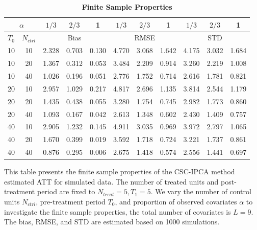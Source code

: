 \documentclass[12pt]{article}
\begin{document}
\begin{table}[!ht]
    \centering
    \caption{\textbf{Finite Sample Properties}}
    \label{tab: finite sample}
    \begin{tabular}{cc|ccc|ccc|ccc}
    \toprule
    \multicolumn{2}{c|}{$\alpha$} & $1/3$ & $2/3$ & 1 & $1/3$ & $2/3$ & 1 & $1/3$ & $2/3$ & 1 \\
    \hline
    $T_0$ & $N_{ctrl}$ & \multicolumn{3}{c|}{Bias} & \multicolumn{3}{c|}{RMSE}  & \multicolumn{3}{c}{STD} \\
    \hline
    10 & 10 & 2.328 & 0.703 & 0.130 & 4.770 & 3.068 & 1.642 & 4.175 & 3.032 & 1.684 \\
    10 & 20 & 1.367 & 0.312 & 0.053 & 3.484 & 2.209 & 0.914 & 3.260 & 2.219 & 1.008 \\
    10 & 40 & 1.026 & 0.196 & 0.051 & 2.776 & 1.752 & 0.714 & 2.616 & 1.781 & 0.821 \\
    \cline{1-11}
    20 & 10 & 2.957 & 1.029 & 0.217 & 4.817 & 2.696 & 1.135 & 3.814 & 2.544 & 1.179 \\
    20 & 20 & 1.435 & 0.438 & 0.055 & 3.280 & 1.754 & 0.745 & 2.982 & 1.773 & 0.860 \\
    20 & 40 & 1.093 & 0.167 & 0.042 & 2.613 & 1.348 & 0.602 & 2.430 & 1.409 & 0.757 \\
    \cline{1-11}
    40 & 10 & 2.905 & 1.232 & 0.145 & 4.911 & 3.035 & 0.969 & 3.972 & 2.797 & 1.065 \\
    40 & 20 & 1.670 & 0.399 & 0.019 & 3.592 & 1.718 & 0.724 & 3.221 & 1.737 & 0.861 \\
    40 & 40 & 0.876 & 0.295 & 0.006 & 2.675 & 1.418 & 0.574 & 2.556 & 1.441 & 0.697 \\
    \bottomrule
    \end{tabular}
    \begin{tablenotes}
        \item This table presents the finite sample properties of the CSC-IPCA method estimated ATT for simulated data. The number of treated units and post-treatment period are fixed to $N_{treat} = 5, T_1=5$. We vary the number of control units $N_{ctrl}$, pre-treatment period $T_0$, and proportion of observed covariates $\alpha$ to investigate the finite sample properties, the total number of covariates is $L=9$. The bias, RMSE, and STD are estimated based on 1000 simulations.
    \end{tablenotes}
    \end{table}
\end{document}
